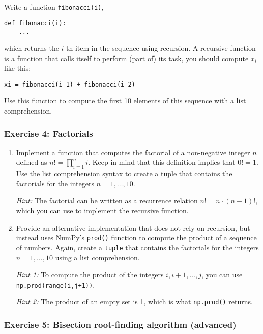\documentclass{scrartcl}
\begin{document}
Write a function \texttt{fibonacci(i)},

\begin{verbatim}
def fibonacci(i):
    ...
\end{verbatim}

which returns the \(i\)-th item in the sequence using recursion. A
recursive function is a function that calls itself to perform (part of)
its task, \ie you should compute \(x_i\) like this:

\begin{verbatim}
xi = fibonacci(i-1) + fibonacci(i-2)
\end{verbatim}

Use this function to compute the first 10 elements of this sequence with
a list comprehension.

    \hypertarget{exercise-4-factorials}{%
\subsubsection{Exercise 4: Factorials}\label{exercise-4-factorials}}

\begin{enumerate}
\def\labelenumi{\arabic{enumi}.}
\item
  Implement a function that computes the factorial of a non-negative
  integer \(n\) defined as \(n! = \prod_{i=1}^n i\). Keep in mind that
  this definition implies that \(0! = 1\). Use the list comprehension
  syntax to create a tuple that contains the factorials for the integers
  \(n=1,\dots,10\).

  \emph{Hint:} The factorial can be written as a recurrence relation
  \(n! = n \cdot (n-1)!\), which you can use to implement the recursive
  function.
\item
  Provide an alternative implementation that does not rely on recursion,
  but instead uses NumPy's \texttt{prod()} function to compute the
  product of a sequence of numbers. Again, create a \texttt{tuple} that
  contains the factorials for the integers \(n=1,\dots,10\) using a list
  comprehension.

  \emph{Hint 1:} To compute the product of the integers
  \(i,i+1,\dots,j\), you can use \texttt{np.prod(range(i,j+1))}.

  \emph{Hint 2:} The product of an empty set is 1, which is what
  \texttt{np.prod()} returns.
\end{enumerate}

    \hypertarget{exercise-5-bisection-root-finding-algorithm-advanced}{%
\subsubsection{Exercise 5: Bisection root-finding algorithm
(advanced)}\label{exercise-5-bisection-root-finding-algorithm-advanced}}
\end{document}
